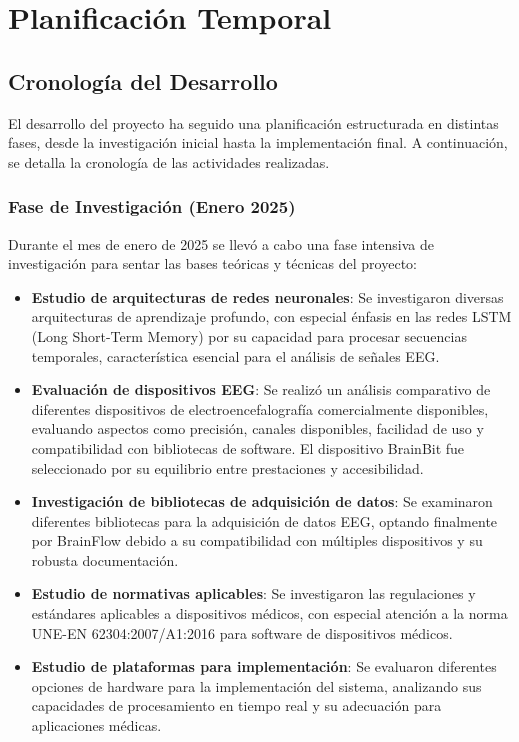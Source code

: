 \chapter{Planificación Temporal}\label{ch:temporal_scheduling}

\section{Cronología del Desarrollo}

El desarrollo del proyecto ha seguido una planificación estructurada en distintas fases, desde la investigación inicial hasta la implementación final. A continuación, se detalla la cronología de las actividades realizadas.

\subsection{Fase de Investigación (Enero 2025)}

Durante el mes de enero de 2025 se llevó a cabo una fase intensiva de investigación para sentar las bases teóricas y técnicas del proyecto:

\begin{itemize}
    \item \textbf{Estudio de arquitecturas de redes neuronales}: Se investigaron diversas arquitecturas de aprendizaje profundo, con especial énfasis en las redes LSTM (Long Short-Term Memory) por su capacidad para procesar secuencias temporales, característica esencial para el análisis de señales EEG.
    
    \item \textbf{Evaluación de dispositivos EEG}: Se realizó un análisis comparativo de diferentes dispositivos de electroencefalografía comercialmente disponibles, evaluando aspectos como precisión, canales disponibles, facilidad de uso y compatibilidad con bibliotecas de software. El dispositivo BrainBit fue seleccionado por su equilibrio entre prestaciones y accesibilidad.
    
    \item \textbf{Investigación de bibliotecas de adquisición de datos}: Se examinaron diferentes bibliotecas para la adquisición de datos EEG, optando finalmente por BrainFlow debido a su compatibilidad con múltiples dispositivos y su robusta documentación.
    
    \item \textbf{Estudio de normativas aplicables}: Se investigaron las regulaciones y estándares aplicables a dispositivos médicos, con especial atención a la norma UNE-EN 62304:2007/A1:2016 para software de dispositivos médicos.
    
    \item \textbf{Estudio de plataformas para implementación}: Se evaluaron diferentes opciones de hardware para la implementación del sistema, analizando sus capacidades de procesamiento en tiempo real y su adecuación para aplicaciones médicas.
\end{itemize}

